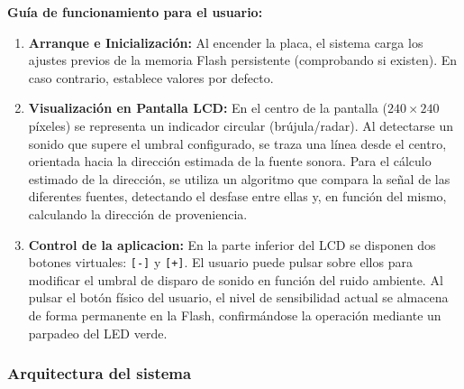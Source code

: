 \documentclass[../main.tex]{subfiles}
\begin{document}
            \textbf{Guía de funcionamiento para el usuario:}

            \begin{enumerate}
                \item \textbf{Arranque e Inicialización:} Al encender la placa, el sistema carga los ajustes previos de la memoria Flash persistente (comprobando si existen). En caso contrario, establece valores por defecto. 
                \item \textbf{Visualización en Pantalla LCD:} En el centro de la pantalla ($240 \times 240$ píxeles) se representa un indicador circular (brújula/radar). Al detectarse un sonido que supere el umbral configurado, se traza una línea desde el centro, orientada hacia la dirección estimada de la fuente sonora. Para el cálculo estimado de la dirección, se utiliza un algoritmo que compara la señal de las diferentes fuentes, detectando el desfase entre ellas y, en función del mismo, calculando la dirección de proveniencia.
                \item \textbf{Control de la aplicacion:} En la parte inferior del LCD se disponen dos botones virtuales: \texttt{[-]} y \texttt{[+]}. El usuario puede pulsar sobre ellos para modificar el umbral de disparo de sonido en función del ruido ambiente. Al pulsar el botón físico del usuario, el nivel de sensibilidad actual se almacena de forma permanente en la Flash, confirmándose la operación mediante un parpadeo del LED verde.
            \end{enumerate}



        \subsubsection{Arquitectura del sistema}
            
\end{document}
